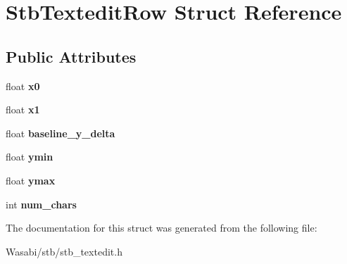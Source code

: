 \hypertarget{struct_stb_textedit_row}{}\section{Stb\+Textedit\+Row Struct Reference}
\label{struct_stb_textedit_row}
\subsection*{Public Attributes}
\begin{DoxyCompactItemize}
\item 
float {\bfseries x0}\hypertarget{struct_stb_textedit_row_af30b3e1d61d1acea26d3e0ebec2cb81d}{}\label{struct_stb_textedit_row_af30b3e1d61d1acea26d3e0ebec2cb81d}

\item 
float {\bfseries x1}\hypertarget{struct_stb_textedit_row_a3a3e1a506030c871a1b3d09bf26e341f}{}\label{struct_stb_textedit_row_a3a3e1a506030c871a1b3d09bf26e341f}

\item 
float {\bfseries baseline\+\_\+y\+\_\+delta}\hypertarget{struct_stb_textedit_row_ad2d72b74b1a61e331949c7f7ec311880}{}\label{struct_stb_textedit_row_ad2d72b74b1a61e331949c7f7ec311880}

\item 
float {\bfseries ymin}\hypertarget{struct_stb_textedit_row_a707d331bd9dc99d64c81f71106b75eed}{}\label{struct_stb_textedit_row_a707d331bd9dc99d64c81f71106b75eed}

\item 
float {\bfseries ymax}\hypertarget{struct_stb_textedit_row_aab290e15f6a3b4a96ab2c2472cc8a7a5}{}\label{struct_stb_textedit_row_aab290e15f6a3b4a96ab2c2472cc8a7a5}

\item 
int {\bfseries num\+\_\+chars}\hypertarget{struct_stb_textedit_row_a1a19bebadb3f82b4f86ea29698d77084}{}\label{struct_stb_textedit_row_a1a19bebadb3f82b4f86ea29698d77084}

\end{DoxyCompactItemize}


The documentation for this struct was generated from the following file\+:\begin{DoxyCompactItemize}
\item 
Wasabi/stb/stb\+\_\+textedit.\+h\end{DoxyCompactItemize}

